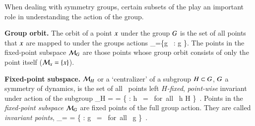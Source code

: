 
When dealing with symmetry groups, certain subsets of the {\statesp} play an important role in understanding the action of the group.

\begin{definition}
\label{def:grouporbit}
\textbf{Group orbit.}
The orbit of a point $x$ under the group $G$ is the set of all points that $x$ are mapped to under the groups actions
\beq
\pS_\ssp=\{{g} \, \ssp: g \in \Group\}.
\eeq
The points in the fixed-point subspace ${\cal M}_{G}$ are those points whose group orbit consists of only the point itself (${\cal M}_{x}=\{x\}$).
\end{definition}

\begin{definition}
\label{def:centralizer}
\textbf{Fixed-point subspace.}
${\cal M}_H$ or a `centralizer' of a subgroup $H \subset G$,
$G$ a symmetry of dynamics, is the set of all \statesp\
points left \emph{$H$-fixed}, \emph{point-wise} invariant
under action of the subgroup
\beq
\pS_H =  =
   \{ \ssp \in \pS : {h} \, \ssp = \ssp \mbox{ for all } h \in H \}
\,.
Points in the \emph{fixed-point subspace}  ${\cal M}_{G}$ are fixed
points of the full group action. They are called \emph{invariant
points},
\beq
\pS_\Group = \Fix{\Group} =
   \{ \ssp \in \pS : {g} \, \ssp = \ssp \mbox{ for all } g \in \Group \}
\,.
\end{definition}
		                                                  \toCB

